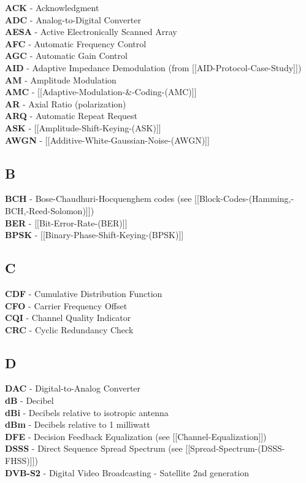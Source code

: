 \textbf{ACK} - Acknowledgment\\
\textbf{ADC} - Analog-to-Digital Converter\\
\textbf{AESA} - Active Electronically Scanned Array\\
\textbf{AFC} - Automatic Frequency Control\\
\textbf{AGC} - Automatic Gain Control\\
\textbf{AID} - Adaptive Impedance Demodulation (from
{[}{[}AID-Protocol-Case-Study{]}{]})\\
\textbf{AM} - Amplitude Modulation\\
\textbf{AMC} - {[}{[}Adaptive-Modulation-\&-Coding-(AMC){]}{]}\\
\textbf{AR} - Axial Ratio (polarization)\\
\textbf{ARQ} - Automatic Repeat Request\\
\textbf{ASK} - {[}{[}Amplitude-Shift-Keying-(ASK){]}{]}\\
\textbf{AWGN} - {[}{[}Additive-White-Gaussian-Noise-(AWGN){]}{]}

\subsection{B}\label{sec:acronyms-b}

\textbf{BCH} - Bose-Chaudhuri-Hocquenghem codes (see
{[}{[}Block-Codes-(Hamming,-BCH,-Reed-Solomon){]}{]})\\
\textbf{BER} - {[}{[}Bit-Error-Rate-(BER){]}{]}\\
\textbf{BPSK} - {[}{[}Binary-Phase-Shift-Keying-(BPSK){]}{]}

\subsection{C}\label{sec:acronyms-c}

\textbf{CDF} - Cumulative Distribution Function\\
\textbf{CFO} - Carrier Frequency Offset\\
\textbf{CQI} - Channel Quality Indicator\\
\textbf{CRC} - Cyclic Redundancy Check

\subsection{D}\label{sec:acronyms-d}

\textbf{DAC} - Digital-to-Analog Converter\\
\textbf{dB} - Decibel\\
\textbf{dBi} - Decibels relative to isotropic antenna\\
\textbf{dBm} - Decibels relative to 1 milliwatt\\
\textbf{DFE} - Decision Feedback Equalization (see
{[}{[}Channel-Equalization{]}{]})\\
\textbf{DSSS} - Direct Sequence Spread Spectrum (see
{[}{[}Spread-Spectrum-(DSSS-FHSS){]}{]})\\
\textbf{DVB-S2} - Digital Video Broadcasting - Satellite 2nd generation

